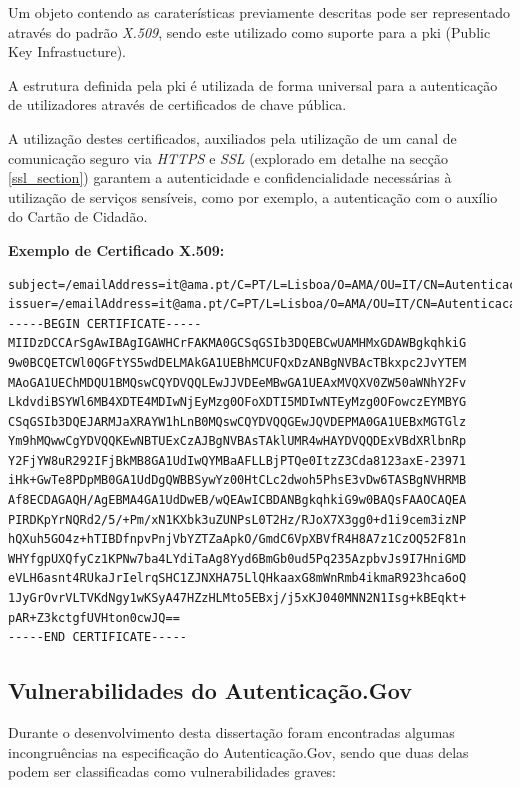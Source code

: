 Um objeto contendo as caraterísticas previamente descritas pode ser representado através do padrão \emph{X.509}, sendo este utilizado como suporte para a \gls{pki} (Public Key Infrastucture).

A estrutura definida pela \gls{pki} é utilizada de forma universal para a autenticação de utilizadores através de certificados de chave pública.\cite{pki}

A utilização destes certificados, auxiliados pela utilização de um canal de comunicação seguro via \emph{HTTPS} e \emph{SSL} (explorado em detalhe na secção \ref{ssl_section}) garantem a autenticidade e confidencialidade necessárias à utilização de serviços sensíveis, como por exemplo, a autenticação com o auxílio do Cartão de Cidadão.

\vspace{10mm}
\textbf{Exemplo de Certificado X.509:}
\begin{verbatim}
subject=/emailAddress=it@ama.pt/C=PT/L=Lisboa/O=AMA/OU=IT/CN=Autenticacao.Gov
issuer=/emailAddress=it@ama.pt/C=PT/L=Lisboa/O=AMA/OU=IT/CN=Autenticacao.Gov
-----BEGIN CERTIFICATE-----
MIIDzDCCArSgAwIBAgIGAWHCrFAKMA0GCSqGSIb3DQEBCwUAMHMxGDAWBgkqhkiG
9w0BCQETCWl0QGFtYS5wdDELMAkGA1UEBhMCUFQxDzANBgNVBAcTBkxpc2JvYTEM
MAoGA1UEChMDQU1BMQswCQYDVQQLEwJJVDEeMBwGA1UEAxMVQXV0ZW50aWNhY2Fv
LkdvdiBSYWl6MB4XDTE4MDIwNjEyMzg0OFoXDTI5MDIwNTEyMzg0OFowczEYMBYG
CSqGSIb3DQEJARMJaXRAYW1hLnB0MQswCQYDVQQGEwJQVDEPMA0GA1UEBxMGTGlz
Ym9hMQwwCgYDVQQKEwNBTUExCzAJBgNVBAsTAklUMR4wHAYDVQQDExVBdXRlbnRp
Y2FjYW8uR292IFjBkMB8GA1UdIwQYMBaAFLLBjPTQe0ItzZ3Cda8123axE-23971
iHk+GwTe8PDpMB0GA1UdDgQWBBSywYz00HtCLc2dwoh5PhsE3vDw6TASBgNVHRMB
Af8ECDAGAQH/AgEBMA4GA1UdDwEB/wQEAwICBDANBgkqhkiG9w0BAQsFAAOCAQEA
PIRDKpYrNQRd2/5/+Pm/xN1KXbk3uZUNPsL0T2Hz/RJoX7X3gg0+d1i9cem3izNP
hQXuh5GO4z+hTIBDfnpvPnjVbYZTZaApkO/GmdC6VpXBVfR4H8A7z1CzOQ52F81n
WHYfgpUXQfyCz1KPNw7ba4LYdiTaAg8Yyd6BmGb0ud5Pq235AzpbvJs9I7HniGMD
eVLH6asnt4RUkaJrIelrqSHC1ZJNXHA75LlQHkaaxG8mWnRmb4ikmaR923hca6oQ
1JyGrOvrVLTVKdNgy1wKSyA47HZzHLMto5EBxj/j5xKJ040MNN2N1Isg+kBEqkt+
pAR+Z3kctgfUVHton0cwJQ==
-----END CERTIFICATE-----
\end{verbatim}

\subsection{Vulnerabilidades do Autenticação.Gov}

Durante o desenvolvimento desta dissertação foram encontradas algumas incongruências na especificação do Autenticação.Gov, sendo que duas delas podem ser classificadas como vulnerabilidades graves:


